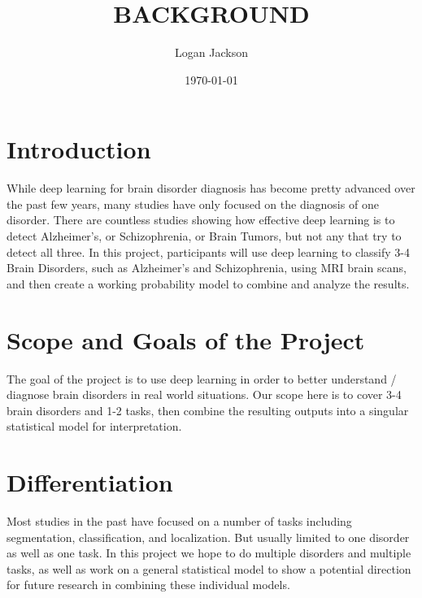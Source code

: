 \documentclass[11pt]{article}
\author{Logan Jackson}
\date{\today}
\title{BACKGROUND}
\begin{document}
\maketitle
\tableofcontents


\section{Introduction}
\label{sec:org9f57747}

While deep learning for brain disorder diagnosis has become pretty advanced over the past few years, many studies have only focused on the diagnosis of one disorder. There are countless studies showing how effective deep learning is to detect Alzheimer’s, or Schizophrenia, or Brain Tumors, but not any that try to detect all three. In this project, participants will use deep learning to classify 3-4 Brain Disorders, such as Alzheimer's and Schizophrenia, using MRI brain scans, and then create a working probability model to combine and analyze the results.

\section{Scope and Goals of the Project}
\label{sec:org44c7c19}

The goal of the project is to use deep learning in order to better understand / diagnose brain disorders in real world situations. Our scope here is to cover 3-4 brain disorders and 1-2 tasks, then combine the resulting outputs into a singular statistical model for interpretation.

\section{Differentiation}
\label{sec:orgcff87d3}

Most studies in the past have focused on a number of tasks including segmentation, classification, and localization. But usually limited to one disorder as well as one task. In this project we hope to do multiple disorders and multiple tasks, as well as work on a general statistical model to show a potential direction for future research in combining these individual models.
\end{document}
